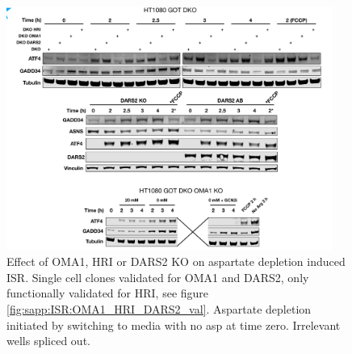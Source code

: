 \begin{figure}[ht]
    \centering
    \includegraphics[width=0.95\textwidth]{figures/sapp/ISR/HT1080_DKO_KO_ISR.pdf}
    \caption[ATF4 post Asp depl. OMA1/HRI KO, western]{
    Effect of OMA1, HRI or DARS2 KO on aspartate depletion induced ISR.
    Single cell clones validated for OMA1 and DARS2, only functionally validated for HRI, see figure \ref{fig:sapp:ISR:OMA1_HRI_DARS2_val}.
    Aspartate depletion initiated by switching to media with no asp at time zero.
    Irrelevant wells spliced out.
    }
    \label{fig:sapp:ISR:HT1080_DKO_KO_ISR}
\end{figure}

